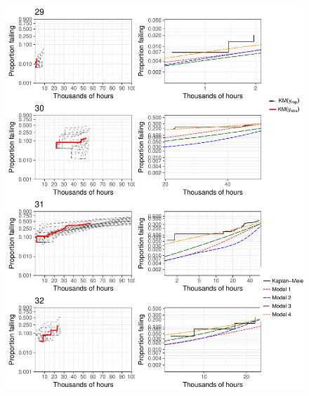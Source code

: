 \documentclass[12pt]{article}
\begin{document}
\begin{figure}[H]
\includegraphics[width=\textwidth]{ppcheck-v2-8.pdf}
\end{figure}
\end{document}
